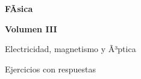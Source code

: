 ﻿\documentclass[11pt,letterpaper,openany]{book}
\newcommand{\numerovolumen}{III}
\newcommand{\nombrevolumen}{Electricidad, magnetismo y Ã³ptica}
\begin{document}

\begin{titlepage}

    \centering

    \vspace*{2.5cm}

    {\color{RojoPrincipal}
    \Huge\bfseries
    FÃ­sica
    \par}

    \vspace{0.8cm}

    {\color{AzulPrincipal}
    \LARGE\bfseries
    Volumen \numerovolumen
    \par}

    \vspace{0.5cm}

    {\Large
    \nombrevolumen
    \par}

    \vspace{1.5cm}

    {\color{AzulPrincipal}
    \Large
    Ejercicios con respuestas
    \par}

    \vfill

    {\Large\bfseries
    \autorlibro
    \par}

    \vspace{2cm}

\end{titlepage}



\frontmatter

\tableofcontents

\cleardoublepage



\mainmatter
\end{document}
